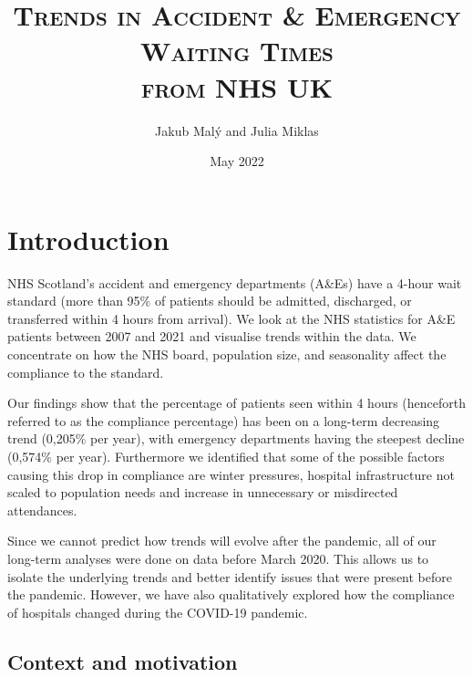 \documentclass[12pt,a4paper]{article}
\title{
    \textsc{\Large Trends in Accident \& Emergency Waiting Times \\
    from NHS UK }
}
\date{May 2022}
\author{Jakub Malý and Julia Miklas}
\begin{document}
%
%

\maketitle
\thispagestyle{empty}

%
%

\vspace{5em}
\renewcommand{\baselinestretch}{1.4}\normalsize
\tableofcontents
\renewcommand{\baselinestretch}{1.6}\normalsize

\renewcommand{\thefootnote}{\Roman{footnote}}

\newpage
{}
\setcounter{page}{1}

%
%

\section{Introduction}

NHS Scotland's accident and emergency departments (A\&Es) have a 4-hour wait standard (more than 95\% of patients should be admitted, discharged, or transferred within 4 hours from arrival). We look at the NHS statistics for A\&E patients between 2007 and 2021 and visualise trends within the data. We concentrate on how the NHS board, population size, and seasonality affect the compliance to the standard. 

Our findings show that the percentage of patients seen within 4 hours (henceforth referred to as the compliance percentage) has been on a long-term decreasing trend (0,205\% per year), with emergency departments having the steepest decline (0,574\% per year). Furthermore we identified that some of the possible factors causing this drop in compliance are winter pressures, hospital infrastructure not scaled to population needs and increase in unnecessary or misdirected attendances. 

Since we cannot predict how trends will evolve after the pandemic, all of our long-term analyses were done on data before March 2020. This allows us to isolate the underlying trends and better identify issues that were present before the pandemic. However, we have also qualitatively explored how the compliance of hospitals changed during the COVID-19 pandemic.

\subsection{Context and motivation} 
\end{document}
